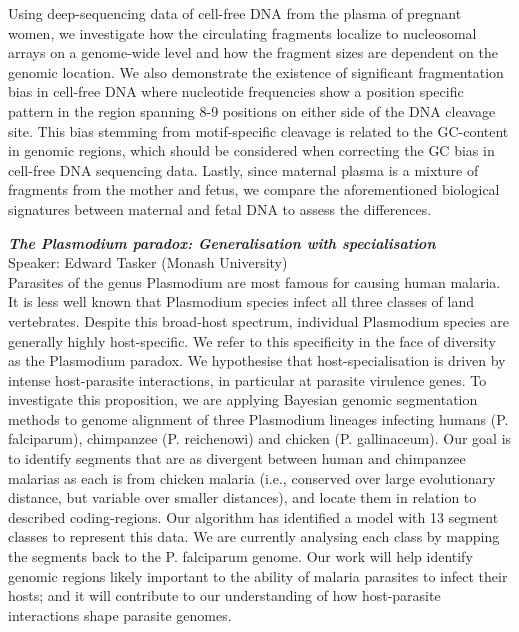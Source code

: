\documentclass[10pt,]{article}
\begin{document}
\begin{minipage}[c]{\linewidth}
{Using deep-sequencing data of cell-free DNA from the plasma of pregnant women,
we investigate how the circulating fragments localize to nucleosomal arrays on
a genome-wide level and how the fragment sizes are dependent on the genomic
location. We also demonstrate the existence of significant fragmentation bias
in cell-free DNA where nucleotide frequencies show a position specific pattern
in the region spanning 8-9 positions on either side of the DNA cleavage site.
This bias stemming from motif-specific cleavage is related to the GC-content in
genomic regions, which should be considered when correcting the GC bias in
cell-free DNA sequencing data. Lastly, since maternal plasma is a mixture of
fragments from the mother and fetus, we compare the aforementioned biological
signatures between maternal and fetal DNA to assess the differences.}

\vspace{3ex}

\emph{\bfseries The Plasmodium paradox: Generalisation with specialisation}\\
Speaker: Edward Tasker (Monash University)\\[1ex]

{\small
Parasites of the genus Plasmodium are most famous for causing human malaria. It
is less well known that Plasmodium species infect all three classes of land
vertebrates. Despite this broad-host spectrum, individual Plasmodium species
are generally highly host-specific. We refer to this specificity in the face of
diversity as the Plasmodium paradox. We hypothesise that host-specialisation is
driven by intense host-parasite interactions, in particular at parasite
virulence genes. To investigate this proposition, we are applying Bayesian
genomic segmentation methods to genome alignment of three Plasmodium lineages
infecting humans (P. falciparum), chimpanzee (P. reichenowi) and chicken (P.
gallinaceum). Our goal is to identify segments that are as divergent between
human and chimpanzee malarias as each is from chicken malaria (i.e., conserved
over large evolutionary distance, but variable over smaller distances), and
locate them in relation to described coding-regions. Our algorithm has
identified a model with 13 segment classes to represent this data. We are
currently analysing each class by mapping the segments back to the P.
falciparum genome. Our work will help identify genomic regions likely important
to the ability of malaria parasites to infect their hosts; and it will
contribute to our understanding of how host-parasite interactions shape
parasite genomes.}

\end{minipage}
\end{document}
